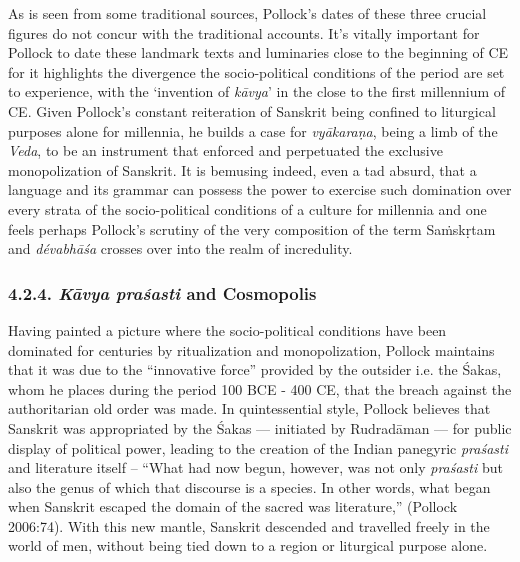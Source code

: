 As is seen from some traditional sources, Pollock’s dates of these three crucial figures do not concur with the traditional accounts. It’s vitally important for Pollock to date these landmark texts and luminaries close to the beginning of CE for it highlights the divergence the socio-political conditions of the period are set to experience, with the ‘invention of \textit{kāvya}’ in the close to the first millennium of CE. Given Pollock’s constant reiteration of Sanskrit being confined to liturgical purposes alone for millennia, he builds a case for \textit{vyākaraṇa}, being a limb of the \textit{Veda}, to be an instrument that enforced and perpetuated the exclusive monopolization of Sanskrit. It is bemusing indeed, even a tad absurd, that a language and its grammar can possess the power to exercise such domination over every strata of the socio-political conditions of a culture for millennia and one feels perhaps Pollock’s scrutiny of the very composition of the term Saṁskṛtam and \textit{dévabhāśa} crosses over into the realm of incredulity.

\vspace{-.5cm}

\subsubsection*{4.2.4. \textit{Kāvya praśasti} and Cosmopolis}

\vspace{-.3cm}

Having painted a picture where the socio-political conditions have been dominated for centuries by ritualization and monopolization, Pollock maintains that it was due to the “innovative force” provided by the outsider i.e. the Śakas, whom he places during the period 100 BCE - 400 CE, that the breach against the authoritarian old order was made. In quintessential style, Pollock believes that Sanskrit was appropriated by the Śakas — initiated by Rudradāman — for public display of political power, leading to the creation of the Indian panegyric \textit{praśasti} and literature itself – “What had now begun, however, was not only \textit{praśasti} but also the genus of which that discourse is a species. In other words, what began when Sanskrit escaped the domain of the sacred was literature,” (Pollock 2006:74). With this new mantle, Sanskrit descended and travelled freely in the world of men, without being tied down to a region or liturgical purpose alone.

